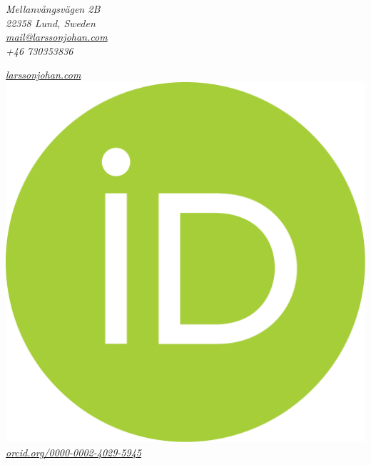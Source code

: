 \documentclass[
  DIV=calc,
  parskip=half,
  headsepline=true
]{scrartcl}
\newlength{\capheight}
\begin{document}
\begin{minipage}{.5\textwidth}
\small
\itshape
\noindent Mellanvångsvägen 2B\\
22358 Lund, Sweden\\
\href{mailto:mail@larssonjohan.com}{mail@larssonjohan.com}\\
+46 730353836

\end{minipage}%
\begin{minipage}{0.5\textwidth}
\raggedleft\itshape\small
\href{https://larssonjohan.com}{larssonjohan.com}\\
\href{http://orcid.org/0000-0002-4029-5945}{\includegraphics[height=\capheight]{assets/orcid.pdf} orcid.org/0000-0002-4029-5945}\\

\end{minipage}
\end{document}
